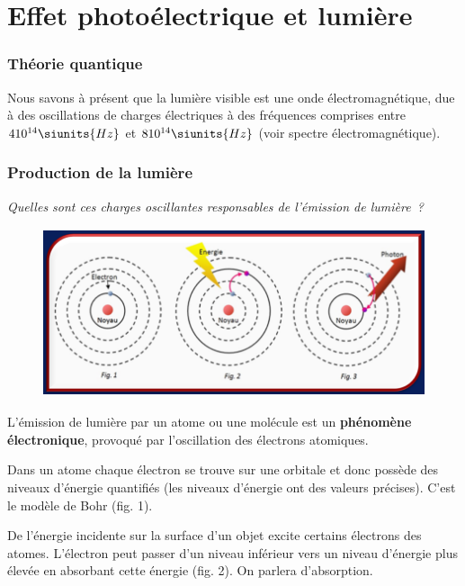 \section{Effet photoélectrique et lumière}

\subsubsection*{Théorie quantique}

Nous savons à présent que la lumière visible est une onde
électromagnétique, due à des oscillations de charges électriques à des
fréquences comprises entre $4 10^{14} \siunits{Hz}$ et
$8 10^{14} \siunits{Hz} $
(voir spectre électromagnétique).

\subsubsection{Production de la lumière}

\emph{Quelles sont ces charges oscillantes responsables de l'émission de
lumière~?}

\begin{figure}
\centering
\includegraphics[width=11.557cm,height=4.957cm]{Pictures/100000010000035A00000170D87D5DDA82610A97.png}
\caption{}
\end{figure}

L'émission de lumière par un atome ou une molécule est un
\textbf{phénomène électronique},
provoqué par l'oscillation des électrons atomiques.

Dans un atome chaque électron se trouve sur une orbitale et donc possède
des niveaux d'énergie quantifiés (les niveaux d'énergie ont des valeurs
précises). C'est le modèle de Bohr (fig. 1).

De l'énergie incidente sur la surface d'un objet excite certains
électrons des atomes. L'électron peut passer d'un niveau inférieur vers
un niveau d'énergie plus élevée en absorbant cette énergie (fig. 2). On
parlera d'absorption.

